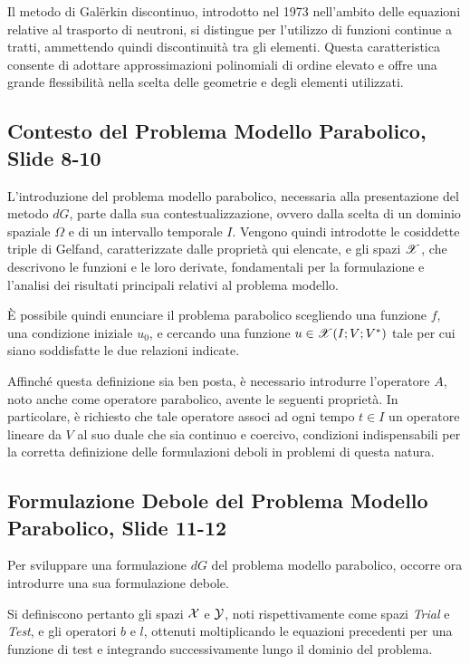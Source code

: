 \documentclass[12pt]{article}
\begin{document}
    Il metodo di Galërkin discontinuo, introdotto nel 1973 nell'ambito delle equazioni relative al trasporto di neutroni, si distingue per l'utilizzo di funzioni continue a tratti, ammettendo quindi discontinuità tra gli elementi. Questa caratteristica consente di adottare approssimazioni polinomiali di ordine elevato e offre una grande flessibilità nella scelta delle geometrie e degli elementi utilizzati.

    \subsection{Contesto del Problema Modello Parabolico, Slide 8-10}

    L'introduzione del problema modello parabolico, necessaria alla presentazione del metodo $dG$, parte dalla sua contestualizzazione, ovvero dalla scelta di un dominio spaziale $\Omega$ e di un intervallo temporale $I$. Vengono quindi introdotte le cosiddette triple di Gelfand, caratterizzate dalle proprietà qui elencate, e gli spazi $\mathscr{X}$, che descrivono le funzioni e le loro derivate, fondamentali per la formulazione e l'analisi dei risultati principali relativi al problema modello.

    È possibile quindi enunciare il problema parabolico scegliendo una funzione $f$, una condizione iniziale $u_0$, e cercando una funzione $u \in \mathscr{X}(I; V; V^*)$ tale per cui siano soddisfatte le due relazioni indicate.

    Affinché questa definizione sia ben posta, è necessario introdurre l'operatore $A$, noto anche come operatore parabolico, avente le seguenti proprietà. In particolare, è richiesto che tale operatore associ ad ogni tempo $t \in I$ un operatore lineare da $V$ al suo duale che sia continuo e coercivo, condizioni indispensabili per la corretta definizione delle formulazioni deboli in problemi di questa natura.

    \subsection{Formulazione Debole del Problema Modello Parabolico, Slide 11-12}

    Per sviluppare una formulazione $dG$ del problema modello parabolico, occorre ora introdurre una sua formulazione debole.

    Si definiscono pertanto gli spazi $\mathcal{X}$ e $\mathcal{Y}$, noti rispettivamente come spazi \textit{Trial} e \textit{Test}, e gli operatori $b$ e $l$, ottenuti moltiplicando le equazioni precedenti per una funzione di test e integrando successivamente lungo il dominio del problema.
\end{document}
